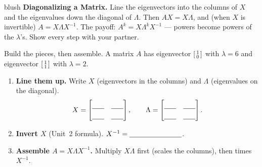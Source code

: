 \documentclass[10pt]{article}
\begin{document}
\namepartnerperiod

\vspace{0.10in}

\begin{headlinebox}{blush}
\small\textbf{Diagonalizing a Matrix.} Line the eigenvectors into the columns of $X$ and the eigenvalues
down the diagonal of $\Lambda$. Then $AX=X\Lambda$, and (when $X$ is invertible)
$A=X\Lambda X^{-1}$. The payoff: $A^k=X\Lambda^k X^{-1}$ --- powers become powers of the $\lambda$'s. Show
every step with your partner.
\end{headlinebox}

\vspace{0.08in}

\begin{tcolorbox}[colback=white, colframe=black!40, title=\textbf{Tier R --- Remediate},
    fonttitle=\bfseries, arc=1.5mm, left=3mm, right=3mm, top=2mm, bottom=2mm, breakable]
Build the pieces, then assemble. A matrix $A$ has eigenvector $\begin{bsmallmatrix}1\\0\end{bsmallmatrix}$
with $\lambda=6$ and eigenvector $\begin{bsmallmatrix}1\\1\end{bsmallmatrix}$ with $\lambda=2$.
\begin{enumerate}[leftmargin=1.7em, itemsep=9pt]
  \item \textbf{Line them up.} Write $X$ (eigenvectors in the columns) and $\Lambda$ (eigenvalues on the diagonal).
        \[ X=\begin{bmatrix}\rule{0pt}{1.1em}\blank{0.6cm}&\blank{0.6cm}\\[3pt]\blank{0.6cm}&\blank{0.6cm}\end{bmatrix},\qquad
           \Lambda=\begin{bmatrix}\rule{0pt}{1.1em}\blank{0.6cm}&\blank{0.6cm}\\[3pt]\blank{0.6cm}&\blank{0.6cm}\end{bmatrix}. \]
  \item \textbf{Invert $X$} (Unit~2 formula). $X^{-1}=\blank{2.6cm}$.
  \item \textbf{Assemble $A=X\Lambda X^{-1}$.} Multiply $X\Lambda$ first (scales the columns), then times $X^{-1}$. 
\end{enumerate}
\end{tcolorbox}
\end{document}
